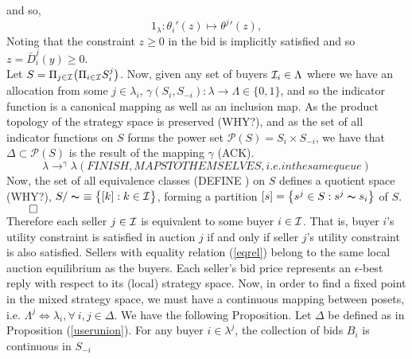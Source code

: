 {\begin{equation}
\end{equation}
and so,
\begin{equation}\label{indeqrel}
         1_\lambda : \theta_i'(z) \mapsto {\theta^j}'(z),
\end{equation}
Noting that the constraint $z\ge 0$ in the bid is implicitly satisfied and so $z =
\bar{D}_i^j(y)\ge 0$.\\
Let $S = \Pi_{j\in\mathcal{I}} \big(\Pi_{i\in\mathcal{I}} S_i^j \big)$. Now, given any set of buyers $\mathcal{I}_i \in \Lambda$ where we have an allocation from some $j \in \lambda_i$,
$\gamma(S_i, S_{-i}) : \lambda \rightarrow \Lambda \in \lbrace{0,1\rbrace}$, and so the indicator function is a canonical mapping as well as an inclusion map. As the product topology of the strategy space is preserved (WHY?), and as the set of all indicator functions on $S$ forms the power set $\mathcal{P}(S) = S_i\times S_{-i}$, we have that $\Delta \subset \mathcal{P}(S)$ is the result of the mapping $\gamma$ (ACK).
$$
    \lambda \rightarrow^\gamma \lambda (FINISH, MAPS TO THEMSELVES, i.e. in the same queue)
$$
Now, the set of all equivalence classes (DEFINE %
) on $S$ defines a quotient space (WHY?), $S / \thicksim \ \equiv \big\lbrace [k] : k\in\mathcal{I} \big\rbrace$, forming a partition
$[s] = \big\lbrace s^j\in S : s^j  \thicksim s_i \big\rbrace$ of $S$. $\qed$} \\
Therefore each seller
$j\in\mathcal{I}$ is equivalent to some buyer $i\in\mathcal{I}$. That is, buyer $i$'s utility constraint is satisfied in auction $j$ if and only if seller $j$'s utility constraint is also satisfied. Sellers with equality relation (\ref{eqrel}) belong to the same local auction equilibrium as the buyers. Each seller's bid price represents an $\epsilon$-best reply with respect to its (local) strategy space. Now, in order to find a fixed point in the mixed strategy space, we must have a continuous mapping between posets, i.e. $\Lambda^j \iff \lambda_i, \forall \ i, j \in \Delta$. We have the following Proposition.
{
Let $\Delta$ be defined as in Proposition (\ref{userunion}). For any buyer
$i\in\lambda^j$, the collection of bids $B_i$ is continuous in $S_{-i}$
}
